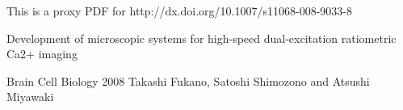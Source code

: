 \documentclass[letterpaper]{article}
\begin{document}
 
This is a proxy PDF for http://dx.doi.org/10.1007/s11068-008-9033-8

Development of microscopic systems for high-speed dual-excitation ratiometric Ca2+ imaging

Brain Cell Biology 2008
Takashi Fukano, Satoshi Shimozono and Atsushi Miyawaki
\end{document}
